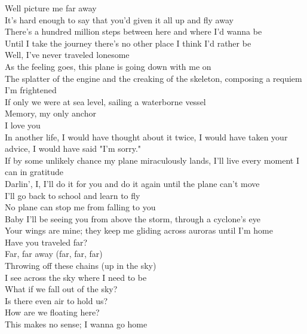 Well picture me far away\\
It's hard enough to say that you'd given it all up and fly away\\
There's a hundred million steps between here and where I'd wanna be\\
Until I take the journey there's no other place I think I'd rather be\\

Well, I've never traveled lonesome\\
As the feeling goes, this plane is going down with me on\\

The splatter of the engine and the creaking of the skeleton, composing a requiem\\
I'm frightened\\
If only we were at sea level, sailing a waterborne vessel\\
Memory, my only anchor\\
I love you\\
In another life, I would have thought about it twice, I would have taken your advice, I would have said "I'm sorry."\\
If by some unlikely chance my plane miraculously lands, I'll live every moment I can in gratitude\\

Darlin', I, I'll do it for you and do it again until the plane can't move\\
I'll go back to school and learn to fly\\
No plane can stop me from falling to you\\
Baby I'll be seeing you from above the storm, through a cyclone's eye\\
Your wings are mine; they keep me gliding across auroras until I'm home\\

Have you traveled far?\\
Far, far away (far, far, far)\\
Throwing off these chains (up in the sky)\\
I see across the sky where I need to be\\

What if we fall out of the sky?\\
Is there even air to hold us?\\
How are we floating here?\\
This makes no sense; I wanna go home\\

